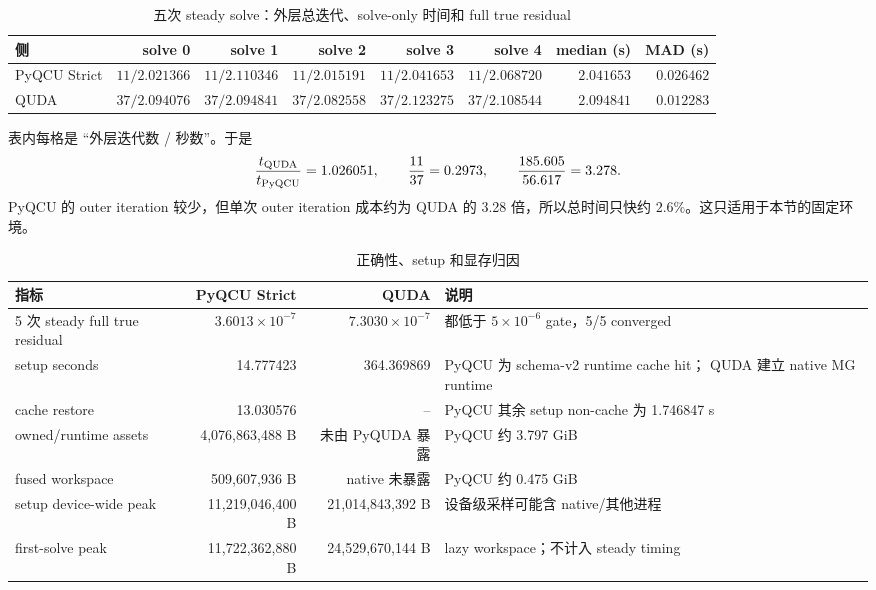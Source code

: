 \documentclass[UTF8,a4paper,11pt]{ctexart}
\begin{document}
\begin{table}[htbp]
\centering
\caption{五次 steady solve：外层总迭代、solve-only 时间和 full true residual}
\small
\begin{tabular}{@{}lrrrrrrr@{}}
\toprule
侧 & solve 0 & solve 1 & solve 2 & solve 3 & solve 4 & median (s) & MAD (s) \\
\midrule
PyQCU Strict & $11/2.021366$ & $11/2.110346$ & $11/2.015191$ &
$11/2.041653$ & $11/2.068720$ & $2.041653$ & $0.026462$ \\
QUDA & $37/2.094076$ & $37/2.094841$ & $37/2.082558$ &
$37/2.123275$ & $37/2.108544$ & $2.094841$ & $0.012283$ \\
\bottomrule
\end{tabular}
\end{table}
表内每格是 ``外层迭代数 / 秒数''。于是
\begin{equation}
 \frac{t_{\rm QUDA}}{t_{\rm PyQCU}}=1.026051,
 \qquad
 \frac{11}{37}=0.2973,
 \qquad
 \frac{185.605}{56.617}=3.278 .
 \label{eq:timing-ratios}
\end{equation}
PyQCU 的 outer iteration 较少，但单次 outer iteration 成本约为 QUDA 的
3.28 倍，所以总时间只快约 $2.6\%$。这只适用于本节的固定环境。

\begin{table}[htbp]
\centering
\caption{正确性、setup 和显存归因}
\small
\begin{tabularx}{\textwidth}{@{}p{}rrX@{}}
\toprule
指标 & PyQCU Strict & QUDA & 说明 \\
\midrule
5 次 steady full true residual & $3.6013\times10^{-7}$ &
$7.3030\times10^{-7}$ & 都低于 $5\times10^{-6}$ gate，5/5 converged \\
setup seconds & 14.777423 & 364.369869 & PyQCU 为 schema-v2 runtime cache hit；
QUDA 建立 native MG runtime \\
cache restore & 13.030576 & -- & PyQCU 其余 setup non-cache 为 1.746847 s \\
owned/runtime assets & 4,076,863,488 B & 未由 PyQUDA 暴露 & PyQCU 约 3.797 GiB \\
fused workspace & 509,607,936 B & native 未暴露 & PyQCU 约 0.475 GiB \\
setup device-wide peak & 11,219,046,400 B & 21,014,843,392 B & 设备级采样可能含 native/其他进程 \\
first-solve peak & 11,722,362,880 B & 24,529,670,144 B & lazy workspace；不计入 steady timing \\
\bottomrule
\end{tabularx}
\end{table}
\end{document}
